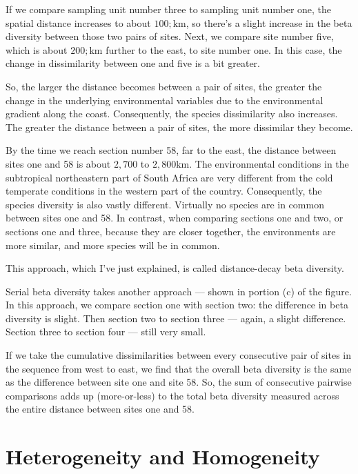 \documentclass[
  12pt,
]{book}
\begin{document}
If we compare sampling unit number three to sampling unit number one,
the spatial distance increases to about \(100;\mathrm{km}\), so there's
a slight increase in the beta diversity between those two pairs of
sites. Next, we compare site number five, which is about
\(200;\mathrm{km}\) further to the east, to site number one. In this
case, the change in dissimilarity between one and five is a bit greater.

So, the larger the distance becomes between a pair of sites, the greater
the change in the underlying environmental variables due to the
environmental gradient along the coast. Consequently, the species
dissimilarity also increases. The greater the distance between a pair of
sites, the more dissimilar they become.

By the time we reach section number 58, far to the east, the distance
between sites one and 58 is about \(2{,}700\) to
\(2{,}800 \mathrm{km}\). The environmental conditions in the subtropical
northeastern part of South Africa are very different from the cold
temperate conditions in the western part of the country. Consequently,
the species diversity is also vastly different. Virtually no species are
in common between sites one and 58. In contrast, when comparing sections
one and two, or sections one and three, because they are closer
together, the environments are more similar, and more species will be in
common.

This approach, which I've just explained, is called distance-decay beta
diversity.

Serial beta diversity takes another approach --- shown in portion (c) of
the figure. In this approach, we compare section one with section two:
the difference in beta diversity is slight. Then section two to section
three --- again, a slight difference. Section three to section four ---
still very small.

If we take the cumulative dissimilarities between every consecutive pair
of sites in the sequence from west to east, we find that the overall
beta diversity is the same as the difference between site one and site
58. So, the sum of consecutive pairwise comparisons adds up
(more-or-less) to the total beta diversity measured across the entire
distance between sites one and 58.

\section{Heterogeneity and
Homogeneity}\label{heterogeneity-and-homogeneity}
\end{document}
